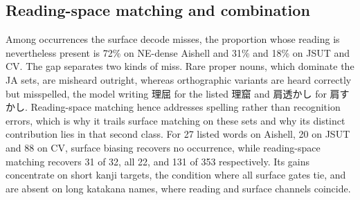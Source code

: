 \documentclass{article}
\begin{document}



\subsection{Reading-space matching and combination}
Among occurrences the surface decode misses, the proportion whose reading is nevertheless present is 72\% on NE-dense Aishell and 31\% and 18\% on JSUT and CV. The gap separates two kinds of miss. Rare proper nouns, which dominate the JA sets, are misheard outright, whereas orthographic variants are heard correctly but misspelled, the model writing 理屈 for the listed 理窟 and 肩透かし for 肩すかし. Reading-space matching hence addresses spelling rather than recognition errors, which is why it trails surface matching on these sets and why its distinct contribution lies in that second class. For 27 listed words on Aishell, 20 on JSUT and 88 on CV, surface biasing recovers no occurrence, while reading-space matching recovers 31 of 32, all 22, and 131 of 353 respectively. Its gains concentrate on short kanji targets, the condition where all surface gates tie, and are absent on long katakana names, where reading and surface channels coincide.
\end{document}
